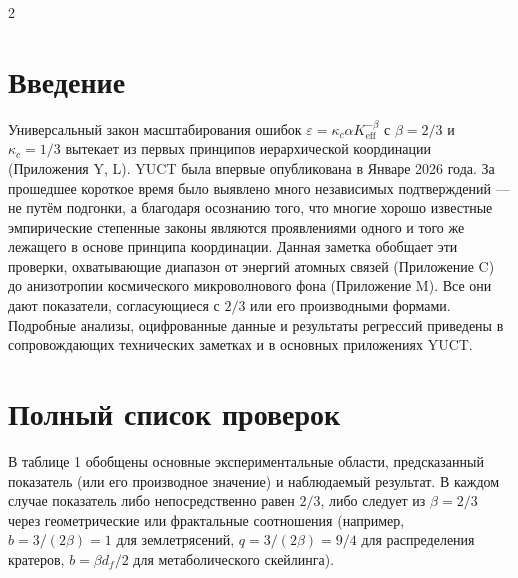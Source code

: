 \documentclass[11pt,a4paper]{article}
\newcommand{\eps}{\varepsilon}
\newcommand{\kappac}{\kappa_c}
\newcommand{\Keff}{K_{\mathrm{eff}}}
\newcommand{\betaf}{\beta}
\begin{document}
	\vspace{0.4cm}
	\vspace*{-\baselineskip}
	\begin{multicols}{2}
		
		\section{Введение}
		
		Универсальный закон масштабирования ошибок \(\eps = \kappac \alpha \Keff^{-\betaf}\) с \(\betaf = 2/3\) и \(\kappac = 1/3\) вытекает из первых принципов иерархической координации (Приложения Y, L). YUCT была впервые опубликована в Январе 2026 года. За прошедшее короткое время было выявлено много независимых подтверждений — не путём подгонки, а благодаря осознанию того, что многие хорошо известные эмпирические степенные законы являются проявлениями одного и того же лежащего в основе принципа координации. Данная заметка обобщает эти проверки, охватывающие диапазон от энергий атомных связей (Приложение C) до анизотропии космического микроволнового фона (Приложение M). Все они дают показатели, согласующиеся с \(2/3\) или его производными формами. Подробные анализы, оцифрованные данные и результаты регрессий приведены в сопровождающих технических заметках \cite{TN1,TN2,TN3,TN4,TN5} и в основных приложениях YUCT.
		
		\section{Полный список проверок}
		
		В таблице 1 обобщены основные экспериментальные области, предсказанный показатель (или его производное значение) и наблюдаемый результат. В каждом случае показатель либо непосредственно равен \(2/3\), либо следует из \(\betaf = 2/3\) через геометрические или фрактальные соотношения (например, \(b = 3/(2\betaf) = 1\) для землетрясений, \(q = 3/(2\betaf) = 9/4\) для распределения кратеров, \(b = \betaf d_f/2\) для метаболического скейлинга).
		

\end{multicols}
\end{document}
